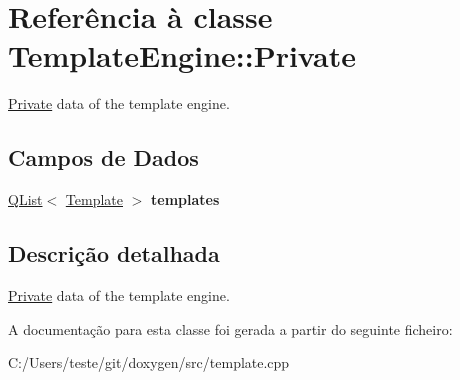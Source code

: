 \hypertarget{class_template_engine_1_1_private}{\section{Referência à classe Template\-Engine\-:\-:Private}
\label{class_template_engine_1_1_private}
}


\hyperlink{class_template_engine_1_1_private}{Private} data of the template engine.  


\subsection*{Campos de Dados}
\begin{DoxyCompactItemize}
\item 
\hypertarget{class_template_engine_1_1_private_a9a48e63d68397f2d47762197d255e3a3}{\hyperlink{class_q_list}{Q\-List}$<$ \hyperlink{class_template}{Template} $>$ {\bfseries templates}}\label{class_template_engine_1_1_private_a9a48e63d68397f2d47762197d255e3a3}

\end{DoxyCompactItemize}


\subsection{Descrição detalhada}
\hyperlink{class_template_engine_1_1_private}{Private} data of the template engine. 

A documentação para esta classe foi gerada a partir do seguinte ficheiro\-:\begin{DoxyCompactItemize}
\item 
C\-:/\-Users/teste/git/doxygen/src/template.\-cpp\end{DoxyCompactItemize}
